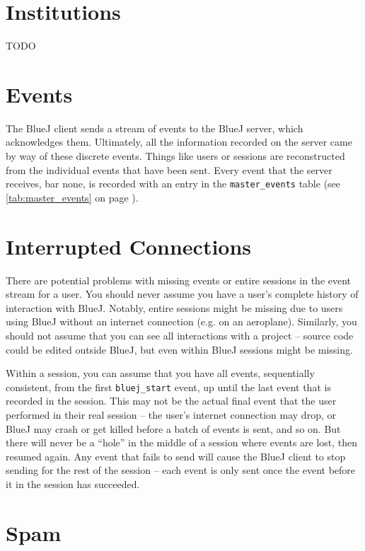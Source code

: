 \documentclass{book}
\newcommand{\myref}[1]{\autoref{#1} on page \pageref*{#1}}
\newcommand{\tabref}[1]{\lstinline|#1| table (see \myref{tab:#1})}
\begin{document}
\section{Institutions}
\label{def:institution_id}

TODO

\section{Events}

The BlueJ client sends a stream of events to the BlueJ server, which
acknowledges them.  Ultimately, all the information recorded on the server
came by way of these discrete events.  Things like users or sessions are
reconstructed from the individual events that have been sent.  Every event
that the server receives, bar none, is recorded with an entry in the \tabref{master_events}.

\section{Interrupted Connections}
\label{def:interruption}

There are potential problems with missing events or entire sessions in the
event stream for a user.  You should
never assume you have a user's complete history of interaction with BlueJ.
Notably, entire sessions might be missing due to users using BlueJ without an
internet connection (e.g. on an aeroplane).  Similarly, you should not assume
that you can see all interactions with a project -- source code could be
edited outside BlueJ, but even within BlueJ sessions might be missing.

Within a session, you can assume that you have all events, sequentially
consistent, from the first \texttt{bluej\_start} event, up until the last
event that is recorded in the session.  This may not be the actual final event
that the user performed in their real session -- the user's
internet connection may drop, or BlueJ may crash or get killed before a batch of events
is sent, and so on.  But there will never be a ``hole'' in the middle of a
session where events are lost, then resumed again.  Any event that fails to
send will cause the BlueJ client to stop sending for the rest of the session
-- each event is only sent once the event before it in the session has succeeded.

\section{Spam}
\label{def:spam}
\end{document}
